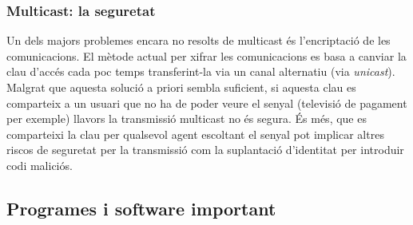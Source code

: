 \subsubsection{Multicast: la seguretat}
{
    Un dels majors problemes encara no resolts de multicast és l'encriptació de les comunicacions. El mètode actual per xifrar les comunicacions es
    basa a canviar la clau d'accés cada poc temps transferint-la via un canal alternatiu (via \textit{unicast}). Malgrat que aquesta solució a priori
    sembla suficient, si aquesta clau es comparteix a un usuari que no ha de poder veure el senyal (televisió de pagament per exemple) llavors la
    transmissió multicast no és segura. És més, que es comparteixi la clau per qualsevol agent escoltant el senyal pot implicar altres riscos de
    seguretat per la transmissió com la suplantació d'identitat per introduir codi maliciós.
}

\subsection{Programes i software important}
{

}